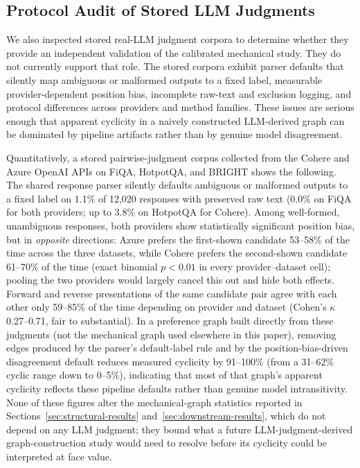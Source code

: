 \documentclass[manuscript,anonymous,review]{acmart}
\begin{document}
\subsection{Protocol Audit of Stored LLM Judgments}
\label{sec:real-llm}

We also inspected stored real-LLM judgment corpora to determine whether they
provide an independent validation of the calibrated mechanical study. They do
not currently support that role. The stored corpora exhibit parser defaults
that silently map ambiguous or malformed outputs to a fixed label, measurable
provider-dependent position bias, incomplete raw-text and exclusion logging,
and protocol differences across providers and method families. These issues are
serious enough that apparent cyclicity in a naively constructed LLM-derived
graph can be dominated by pipeline artifacts rather than by genuine model
disagreement.

Quantitatively, a stored pairwise-judgment corpus collected from the Cohere
and Azure OpenAI APIs on FiQA, HotpotQA, and BRIGHT shows the following. The
shared response parser silently defaults ambiguous or malformed outputs to a
fixed label on 1.1\% of 12{,}020 responses with preserved raw text (0.0\% on
FiQA for both providers; up to 3.8\% on HotpotQA for Cohere). Among
well-formed, unambiguous responses, both providers show statistically
significant position bias, but in \emph{opposite} directions: Azure prefers the
first-shown candidate 53--58\% of the time across the three datasets, while
Cohere prefers the second-shown candidate 61--70\% of the time (exact binomial
$p<0.01$ in every provider--dataset cell); pooling the two providers would
largely cancel this out and hide both effects. Forward and reverse
presentations of the same candidate pair agree with each other only 59--85\% of
the time depending on provider and dataset (Cohen's $\kappa$ 0.27--0.71, fair
to substantial). In a preference graph built directly from these judgments
(not the mechanical graph used elsewhere in this paper), removing edges
produced by the parser's default-label rule and by the position-bias-driven
disagreement default reduces measured cyclicity by 91--100\% (from a
31--62\% cyclic range down to 0--5\%), indicating that most of that graph's
apparent cyclicity reflects these pipeline defaults rather than genuine
model intransitivity. None of these figures alter the mechanical-graph
statistics reported in Sections~\ref{sec:structural-results}
and~\ref{sec:downstream-results}, which do not depend on any LLM judgment;
they bound what a future LLM-judgment-derived graph-construction study would
need to resolve before its cyclicity could be interpreted at face value.
\end{document}
